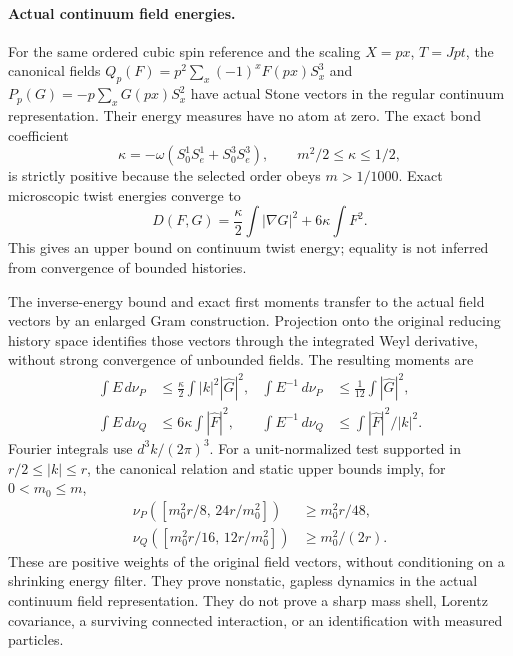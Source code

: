 \paragraph{Actual continuum field energies.}
For the same ordered cubic spin reference and the scaling
$X=px$, $T=Jpt$, the canonical fields
$Q_p(F)=p^2\sum_x(-1)^xF(px)S_x^3$ and
$P_p(G)=-p\sum_xG(px)S_x^2$ have actual Stone vectors in the
regular continuum representation. Their energy measures have no atom at
zero. The exact bond coefficient
\[
 \kappa=-\omega(S_0^1S_e^1+S_0^3S_e^3),
 \qquad m^2/2\leq\kappa\leq1/2,
\]
is strictly positive because the selected order obeys $m>1/1000$.
Exact microscopic twist energies converge to
\[
 D(F,G)=\frac{\kappa}{2}\int|\nabla G|^2+6\kappa\int F^2.
\]
This gives an upper bound on continuum twist energy; equality is not
inferred from convergence of bounded histories.

The inverse-energy bound and exact first moments transfer to the actual
field vectors by an enlarged Gram construction. Projection onto the
original reducing history space identifies those vectors through the
integrated Weyl derivative, without strong convergence of unbounded
fields. The resulting moments are
\[
 \begin{aligned}
 \int E\,d\nu_P&\leq\frac{\kappa}{2}\int |k|^2|\widehat G|^2,
 &\int E^{-1}\,d\nu_P&\leq\frac1{12}\int|\widehat G|^2,\\
 \int E\,d\nu_Q&\leq6\kappa\int|\widehat F|^2,
 &\int E^{-1}\,d\nu_Q&\leq\int |\widehat F|^2/|k|^2.
 \end{aligned}
\]
Fourier integrals use $d^3k/(2\pi)^3$.
For a unit-normalized test supported in $r/2\leq|k|\leq r$,
the canonical relation and static upper bounds imply, for $0<m_0\leq m$,
\[
 \begin{aligned}
 \nu_P\!\left([m_0^2r/8,\,24r/m_0^2]\right)&\geq m_0^2r/48,\\
 \nu_Q\!\left([m_0^2r/16,\,12r/m_0^2]\right)&\geq m_0^2/(2r).
 \end{aligned}
\]
These are positive weights of the original field vectors, without
conditioning on a shrinking energy filter. They prove nonstatic,
gapless dynamics in the actual continuum field representation. They
do not prove a sharp mass shell, Lorentz covariance, a surviving
connected interaction, or an identification with measured particles.
